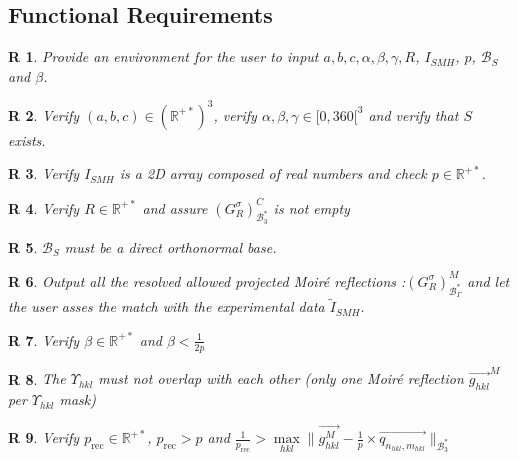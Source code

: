 \documentclass[12pt]{article}
\newcommand\norm[1]{\lVert#1\rVert}
\newtheorem{R}{R}
\begin{document}
\subsection{Functional Requirements}

\begin{R}
\label{R_user_input}
\normalfont Provide an environment for the user to input 
 $a, b, c, \alpha, \beta, \gamma, R$, $I_{SMH}$, $p$, $\mathcal{B}_{S}$ and $\beta$.
\end{R}

\begin{R}
\label{R_verify_crystal}
\normalfont Verify $(a,b,c) \in {(\mathbb{R}^{+*})}^{3}$, verify $\alpha, \beta, \gamma \in [0,360[^{3}$ and verify that $S$ exists.
\end{R}

\begin{R}
\label{R_verify_SMH}
\normalfont Verify $I_{SMH}$ is a 2D array composed of real numbers and check $p \in \mathbb{R}^{+*}$.
\end{R}

\begin{R}
\label{R_crystal_resolved}
\normalfont Verify $R\in\mathbb{R}^{+*}$ and assure $(G^{\sigma}_{R})^{C}_{\mathcal{B}_{3}^{*}}$ is not empty
\end{R}

\begin{R}
\label{R_sampling_base}
\normalfont  $\mathcal{B}_{S}$ must be a direct orthonormal base.
\end{R}

\begin{R}
\label{R_Moire_shift}
\normalfont Output all the resolved allowed projected Moir{\'e} reflections :$(G^{\sigma}_{R})^{M}_{\mathcal{B}_{\Gamma}^{*}}$  and let the user asses the match with the experimental data $\tilde{I}_{SMH}$.
\end{R}

\begin{R}
\label{R_mask_existence}
\normalfont Verify $\beta \in \mathbb{R}^{+*}$ and $\beta < \frac{1}{2p}$
\end{R}

\begin{R}
\label{R_reflection_isolated}
\normalfont The $\Upsilon_{hkl}$ must not overlap with each other (only one Moir{\'e} reflection $\overrightarrow{g_{hkl}}^{M}$ per $\Upsilon_{hkl}$ mask)
\end{R}

\begin{R}
\label{R_pixel_rec}
\normalfont Verify $p_{\text{rec}} \in \mathbb{R}^{+*}$, $p_{\text{rec}} > p$ and $ \frac{1}{p_{\text{rec}}} > \max\limits_{hkl} \norm{\overrightarrow{g_{hkl}^{M}} - \frac{1}{p} \times \overrightarrow{q_{n_{hkl},m_{hkl}}}}_{\mathcal{B}_{3}^{*}}$
\end{R}
\end{document}
